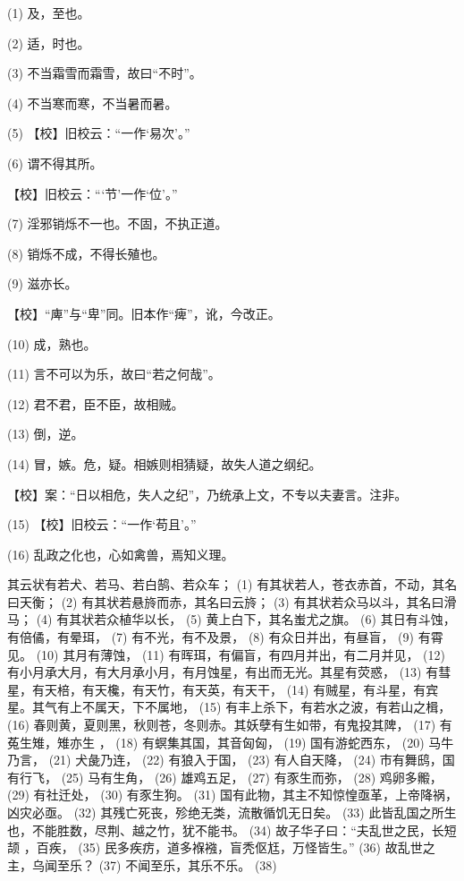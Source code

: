 \documentclass[12pt,UTF8]{ctexbook}
\begin{document}
(1) 及，至也。

(2) 适，时也。

(3) 不当霜雪而霜雪，故曰“不时”。

(4) 不当寒而寒，不当暑而暑。

(5) 【校】旧校云：“一作‘易次’。”

(6) 谓不得其所。

【校】旧校云：“‘节’一作‘位’。”

(7) 淫邪销烁不一也。不固，不执正道。

(8) 销烁不成，不得长殖也。

(9) 滋亦长。

【校】“庳”与“卑”同。旧本作“痺”，讹，今改正。

(10) 成，熟也。

(11) 言不可以为乐，故曰“若之何哉”。

(12) 君不君，臣不臣，故相贼。

(13) 倒，逆。

(14) 冒，嫉。危，疑。相嫉则相猜疑，故失人道之纲纪。

【校】案：“日以相危，失人之纪”，乃统承上文，不专以夫妻言。注非。

(15) 【校】旧校云：“一作‘苟且’。”

(16) 乱政之化也，心如禽兽，焉知义理。

其云状有若犬、若马、若白鹄、若众车； (1) 有其状若人，苍衣赤首，不动，其名曰天衡； (2) 有其状若悬旍而赤，其名曰云旍； (3) 有其状若众马以斗，其名曰滑马； (4) 有其状若众植华以长， (5) 黄上白下，其名蚩尤之旗。 (6) 其日有斗蚀，有倍僪，有晕珥， (7) 有不光，有不及景， (8) 有众日并出，有昼盲， (9) 有霄见。 (10) 其月有薄蚀， (11) 有晖珥，有偏盲，有四月并出，有二月并见， (12) 有小月承大月，有大月承小月，有月蚀星，有出而无光。其星有荧惑， (13) 有彗星，有天棓，有天欃，有天竹，有天英，有天干， (14) 有贼星，有斗星，有宾星。其气有上不属天，下不属地， (15) 有丰上杀下，有若水之波，有若山之楫， (16) 春则黄，夏则黑，秋则苍，冬则赤。其妖孽有生如带，有鬼投其陴， (17) 有菟生雉，雉亦生 ， (18) 有螟集其国，其音匈匈， (19) 国有游蛇西东， (20) 马牛乃言， (21) 犬彘乃连， (22) 有狼入于国， (23) 有人自天降， (24) 市有舞鸱，国有行飞， (25) 马有生角， (26) 雄鸡五足， (27) 有豕生而弥， (28) 鸡卵多毈， (29) 有社迁处， (30) 有豕生狗。 (31) 国有此物，其主不知惊惶亟革，上帝降祸，凶灾必亟。 (32) 其残亡死丧，殄绝无类，流散循饥无日矣。 (33) 此皆乱国之所生也，不能胜数，尽荆、越之竹，犹不能书。 (34) 故子华子曰：“夫乱世之民，长短颉 ，百疾， (35) 民多疾疠，道多褓襁，盲秃伛尪，万怪皆生。” (36) 故乱世之主，乌闻至乐？ (37) 不闻至乐，其乐不乐。 (38)
\end{document}
